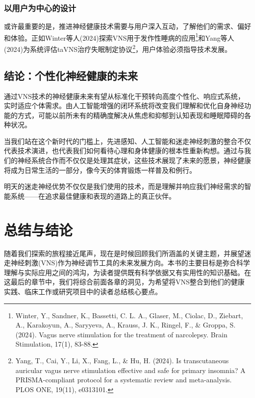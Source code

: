 \documentclass[
  Letterpaper,
]{scrbook}
\begin{document}
\subsection{以用户为中心的设计}\label{ux4ee5ux7528ux6237ux4e3aux4e2dux5fc3ux7684ux8bbeux8ba1}

或许最重要的是，推进神经健康技术需要与用户深入互动，了解他们的需求、偏好和体验。正如Winter等人(2024)探索VNS用于发作性睡病的应用\footnote{Winter,
  Y., Sandner, K., Bassetti, C. L. A., Glaser, M., Ciolac, D., Ziebart,
  A., Karakoyun, A., Saryyeva, A., Krauss, J. K., Ringel, F., \& Groppa,
  S. (2024). Vagus nerve stimulation for the treatment of narcolepsy.
  Brain Stimulation, 17(1), 83-88.}和Yang等人(2024)为系统评估taVNS治疗失眠制定协议\footnote{Yang,
  T., Cai, Y., Li, X., Fang, L., \& Hu, H. (2024). Is transcutaneous
  auricular vagus nerve stimulation effective and safe for primary
  insomnia? A PRISMA-compliant protocol for a systematic review and
  meta-analysis. PLOS ONE, 19(11), e0313101.}，用户体验必须指导技术发展。

\section{结论：个性化神经健康的未来}\label{ux7ed3ux8bbaux4e2aux6027ux5316ux795eux7ecfux5065ux5eb7ux7684ux672aux6765}

通过VNS技术的神经健康未来有望从标准化干预转向高度个性化、响应式系统，实时适应个体需求。由人工智能增强的闭环系统将改变我们理解和优化自身神经功能的方式，可能以前所未有的精确度解决从焦虑和抑郁到认知表现和睡眠障碍的各种状况。

当我们站在这个新时代的门槛上，先进感知、人工智能和迷走神经刺激的整合不仅代表技术演进，也代表我们如何看待心理和身体健康的根本性重新构想。通过与我们的神经系统合作而不仅仅是处理其症状，这些技术展现了未来的愿景，神经健康将成为日常生活的一部分，像今天的体育锻炼一样普及和例行。

明天的迷走神经优势不仅仅是我们使用的技术，而是理解并响应我们神经需求的智能系统------在追求最佳健康和表现的道路上的真正伙伴。


\chapter{总结与结论}\label{ux603bux7ed3ux4e0eux7ed3ux8bba}

随着我们探索的旅程接近尾声，现在是时候回顾我们所涵盖的关键主题，并展望迷走神经刺激(VNS)作为神经调节工具的未来发展方向。本书的主要目标是弥合科学理解与实际应用之间的鸿沟，为读者提供既有科学依据又有实用性的知识基础。在这最后的章节中，我们将综合前面各章的洞见，为希望将VNS整合到他们的健康实践、临床工作或研究项目中的读者总结核心要点。
\end{document}
